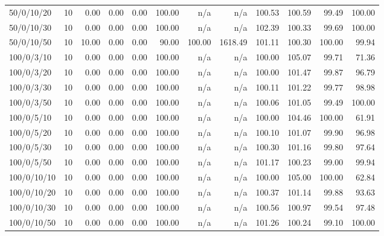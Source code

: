 \begin{table}[htbp]
{\begin{tabular}{lr*{10}{r}}
50/0/10/20 & 10 &  0.00 &  0.00 &  0.00 & 100.00 & n/a & n/a & 100.53 & 100.59 & 99.49 & 100.00 \\ 
50/0/10/30 & 10 &  0.00 &  0.00 &  0.00 & 100.00 & n/a & n/a & 102.39 & 100.33 & 99.69 & 100.00 \\ 
50/0/10/50 & 10 & 10.00 &  0.00 &  0.00 & 90.00 & 100.00 & 1618.49 & 101.11 & 100.30 & 100.00 & 99.94 \\ 
100/0/3/10 & 10 &  0.00 &  0.00 &  0.00 & 100.00 & n/a & n/a & 100.00 & 105.07 & 99.71 & 71.36 \\ 
100/0/3/20 & 10 &  0.00 &  0.00 &  0.00 & 100.00 & n/a & n/a & 100.00 & 101.47 & 99.87 & 96.79 \\ 
100/0/3/30 & 10 &  0.00 &  0.00 &  0.00 & 100.00 & n/a & n/a & 100.11 & 101.22 & 99.77 & 98.98 \\ 
100/0/3/50 & 10 &  0.00 &  0.00 &  0.00 & 100.00 & n/a & n/a & 100.06 & 101.05 & 99.49 & 100.00 \\ 
100/0/5/10 & 10 &  0.00 &  0.00 &  0.00 & 100.00 & n/a & n/a & 100.00 & 104.46 & 100.00 & 61.91 \\ 
100/0/5/20 & 10 &  0.00 &  0.00 &  0.00 & 100.00 & n/a & n/a & 100.10 & 101.07 & 99.90 & 96.98 \\ 
100/0/5/30 & 10 &  0.00 &  0.00 &  0.00 & 100.00 & n/a & n/a & 100.30 & 101.16 & 99.80 & 97.64 \\ 
100/0/5/50 & 10 &  0.00 &  0.00 &  0.00 & 100.00 & n/a & n/a & 101.17 & 100.23 & 99.00 & 99.94 \\ 
100/0/10/10 & 10 &  0.00 &  0.00 &  0.00 & 100.00 & n/a & n/a & 100.00 & 105.00 & 100.00 & 62.84 \\ 
100/0/10/20 & 10 &  0.00 &  0.00 &  0.00 & 100.00 & n/a & n/a & 100.37 & 101.14 & 99.88 & 93.63 \\ 
100/0/10/30 & 10 &  0.00 &  0.00 &  0.00 & 100.00 & n/a & n/a & 100.56 & 100.97 & 99.54 & 97.48 \\ 
100/0/10/50 & 10 &  0.00 &  0.00 &  0.00 & 100.00 & n/a & n/a & 101.26 & 100.24 & 99.10 & 100.00 \\ 
\bottomrule
\end{tabular}
}
\end{table}

